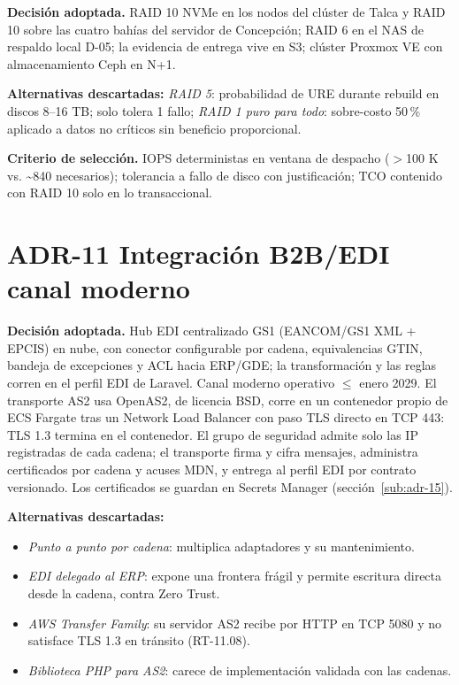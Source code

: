 \textbf{Decisión adoptada.} RAID 10 NVMe en los nodos del clúster de Talca y RAID 10 sobre las cuatro bahías del servidor de Concepción; RAID 6 en el NAS de respaldo local D-05; la evidencia de entrega vive en S3; clúster Proxmox VE con almacenamiento Ceph en N+1.

\textbf{Alternativas descartadas:} \emph{RAID 5}: probabilidad de URE durante rebuild en discos 8--16 TB; solo tolera 1 fallo; \emph{RAID 1 puro para todo}: sobre-costo 50\,\% aplicado a datos no críticos sin beneficio proporcional.

\textbf{Criterio de selección.} IOPS deterministas en ventana de despacho ($>$100 K vs. \textasciitilde{}840 necesarios); tolerancia a fallo de disco con justificación; TCO contenido con RAID 10 solo en lo transaccional.

\section{ADR-11 \textperiodcentered{} Integración B2B/EDI canal moderno}
\label{sub:adr-11}

\textbf{Decisión adoptada.} Hub EDI centralizado GS1 (EANCOM/GS1 XML + EPCIS) en nube, con conector configurable por cadena, equivalencias GTIN, bandeja de excepciones y ACL hacia ERP/GDE; la transformación y las reglas corren en el perfil EDI de Laravel. Canal moderno operativo $\leq$ enero 2029. El transporte AS2 usa OpenAS2, de licencia BSD, corre en un contenedor propio de ECS Fargate tras un Network Load Balancer con paso TLS directo en TCP 443: TLS 1.3 termina en el contenedor. El grupo de seguridad admite solo las IP registradas de cada cadena; el transporte firma y cifra mensajes, administra certificados por cadena y acuses MDN, y entrega al perfil EDI por contrato versionado. Los certificados se guardan en Secrets Manager (sección~\ref{sub:adr-15}).

\textbf{Alternativas descartadas:}

\begin{itemize}
  \item \emph{Punto a punto por cadena}: multiplica adaptadores y su mantenimiento.
  \item \emph{EDI delegado al ERP}: expone una frontera frágil y permite escritura directa desde la cadena, contra Zero Trust.
  \item \emph{AWS Transfer Family}: su servidor AS2 recibe por HTTP en TCP 5080 y no satisface TLS 1.3 en tránsito (RT-11.08).
  \item \emph{Biblioteca PHP para AS2}: carece de implementación validada con las cadenas.
\end{itemize}

